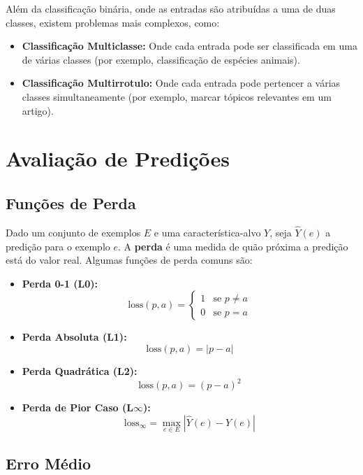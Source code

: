\documentclass{article}
\begin{document}
Além da classificação binária, onde as entradas são atribuídas a uma de duas classes, existem problemas mais complexos, como:

\begin{itemize}
    \item \textbf{Classificação Multiclasse:} Onde cada entrada pode ser classificada em uma de várias classes (por exemplo, classificação de espécies animais).
    \item \textbf{Classificação Multirrotulo:} Onde cada entrada pode pertencer a várias classes simultaneamente (por exemplo, marcar tópicos relevantes em um artigo).
\end{itemize}

\section{Avaliação de Predições}

\subsection{Funções de Perda}

Dado um conjunto de exemplos $E$ e uma característica-alvo $Y$, seja $\hat{Y}(e)$ a predição para o exemplo $e$. A \textbf{perda} é uma medida de quão próxima a predição está do valor real. Algumas funções de perda comuns são:

\begin{itemize}
    \item \textbf{Perda 0-1 (L0):}
    \[
    \text{loss}(p, a) = \begin{cases} 
    1 & \text{se } p \neq a \\
    0 & \text{se } p = a 
    \end{cases}
    \]

    \item \textbf{Perda Absoluta (L1):}
    \[
    \text{loss}(p, a) = |p - a|
    \]

    \item \textbf{Perda Quadrática (L2):}
    \[
    \text{loss}(p, a) = (p - a)^2
    \]

    \item \textbf{Perda de Pior Caso (L$\infty$):}
    \[
    \text{loss}_{\infty} = \max_{e \in E} |\hat{Y}(e) - Y(e)|
    \]
\end{itemize}

\subsection{Erro Médio}
\end{document}
